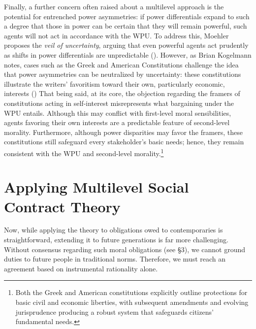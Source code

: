 \documentclass[12pt, a4paper, twoside]{article}
\begin{document}
Finally, a further concern often raised about a multilevel approach is the potential for entrenched power asymmetries: if power differentials expand to such a degree that those in power can be certain that they will remain powerful, such agents will not act in accordance with the WPU. To address this, Moehler proposes the \emph{veil of uncertainty}, arguing that even powerful agents act prudently as shifts in power differentials are unpredictable (\cite[p.\ 144]{moehler2018minimal}). However, as Brian Kogelmann notes, cases such as the Greek and American Constitutions challenge the idea that power asymmetries can be neutralized by uncertainty: these constitutions illustrate the writers’ favoritism toward their own, particularly economic, interests (\cite[p.\ 5–6]{kogelmann2019}) That being said, at its core, the objection regarding the framers of constitutions acting in self-interest misrepresents what bargaining under the WPU entails. Although this may conflict with first-level moral sensibilities, agents favoring their own interests are a predictable feature of second-level morality. Furthermore, although power disparities may favor the framers, these constitutions still safeguard every stakeholder’s basic needs; hence, they remain consistent with the WPU and second-level morality.\footnote{Both the Greek and American constitutions explicitly outline protections for basic civil and economic liberties, with subsequent amendments and evolving jurisprudence producing a robust system that safeguards citizens' fundamental needs.}

\section{Applying Multilevel Social Contract Theory}

Now, while applying the theory to obligations owed to contemporaries is straightforward, extending it to future generations is far more challenging. Without consensus regarding such moral obligations (see §3), we cannot ground duties to future people in traditional norms. Therefore, we must reach an agreement based on instrumental rationality alone.
\end{document}
